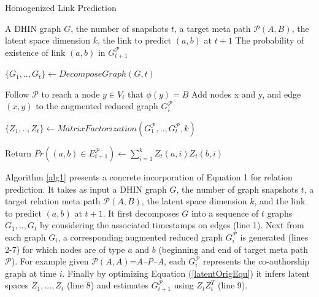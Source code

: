  



\begin{algorithm}[t]
\caption{Homogenized Link Prediction}\label{alg1}
\begin{algorithmic}[1]\scriptsize
\REQUIRE A DHIN graph $G$, the number of snapshots $t$, a target meta path $\mathcal{P}(A,B)$, the latent space dimension $k$, the link to predict $(a,b)$ at $t+1$
\ENSURE The probability of existence of link $(a,b)$ in $G^\mathcal{P}_{t+1}$

\STATE $\{G_1, .., G_t\} \leftarrow DecomposeGraph(G, t)$

    
        \STATE Follow $\mathcal{P}$ to reach a node $y\in V_i$ that $\phi(y)=B$%
        \STATE Add nodes x and y, and edge $(x,y)$ to the augmented reduced graph $G_i^\mathcal{P}$ 
\ENDFOR

\ENDFOR

\STATE $\{Z_1, .., Z_t\} \leftarrow MatrixFactorization(G^\mathcal{P}_1, .., G^\mathcal{P}_t, k)$

\STATE Return $Pr((a,b)\in E^\mathcal{P}_{t+1}) \leftarrow \sum_{i=1}^{k} Z_t(a,i)Z_t(b,i)$


\end{algorithmic}
\end{algorithm}




Algorithm \ref{alg1}  presents a concrete incorporation of Equation 1 for relation prediction. It takes as input a DHIN graph $G$, the number of graph snapshots $t$, a target relation meta path $\mathcal{P}(A,B)$, the latent space dimension $k$, and the link to predict $(a,b)$ at $t+1$. It first decomposes $G$ into a sequence of $t$ graphs $G_1, .., G_t$ by considering the associated timestamps on edges (line 1). Next from each graph $G_i$, a corresponding augmented reduced graph $G^\mathcal{P}_i$ is generated (lines 2-7) for which nodes are of type $a$ and $b$ (beginning and end of target  meta path $\mathcal{P}$). For example given $\mathcal{P}(A,A)$=\textit{A--P--A}, each $G^\mathcal{P}_i$ represents the co-authorship graph at time $i$. Finally by optimizing Equation (\ref{latentOrigEqu}) it infers latent spaces $Z_1, ...,Z_t$ (line 8) and estimates $G^\mathcal{P}_{t+1}$ using $Z_tZ_t^T$ (line 9). 




